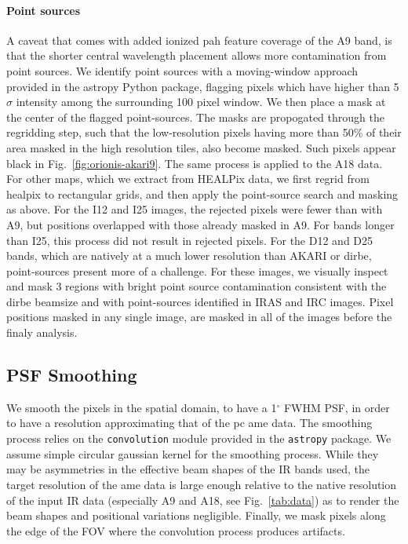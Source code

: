         \paragraph{Point sources}
          A caveat that comes with added ionized \gls{pah} feature coverage of the A9 band, is that the shorter central wavelength placement allows more contamination from point sources. We identify point sources with a moving-window approach provided in the astropy Python package, flagging pixels which have higher than 5$\sigma$ intensity among the surrounding 100 pixel window. We then place a mask at the center of the flagged point-sources. The masks are propogated through the regridding step, such that the low-resolution pixels having more than 50\% of their area masked in the high resolution tiles, also become masked. Such pixels appear black in Fig.~\ref{fig:orionis-akari9}. The same process is applied to the A18 data. For other maps, which we extract from HEALPix data, we first regrid from \gls{healpix} to rectangular grids, and then apply the point-source search and masking as above. For the I12 and I25 images, the rejected pixels were fewer than with A9, but positions overlapped with those already masked in A9. For bands longer than I25, this process did not result in rejected pixels. For the D12 and D25 bands, which are natively at a much lower resolution than AKARI or \gls{dirbe}, point-sources present more of a challenge. For these images, we visually inspect and mask 3 regions with bright point source contamination consistent with the \gls{dirbe} beamsize and with point-sources identified in IRAS and IRC images. Pixel positions masked in any single image, are masked in all of the images before the finaly analysis.


        \subsection{PSF Smoothing}
          We smooth the pixels in the spatial domain, to have a 1$^{\circ}$ FWHM PSF, in order to have a resolution approximating that of the \gls{pc} \gls{ame} data.
          The smoothing process relies on the {\tt convolution} module provided in the {\tt astropy} package. We assume simple circular gaussian kernel for the smoothing process. While they may be asymmetries in the effective beam shapes of the IR bands used, the target resolution of the \gls{ame} data is large enough relative to the native resolution of the input IR data (especially A9 and A18, see Fig.~\ref{tab:data}) as to render the beam shapes and positional variations negligible. Finally, we mask pixels along the edge of the FOV where the convolution process produces artifacts.

